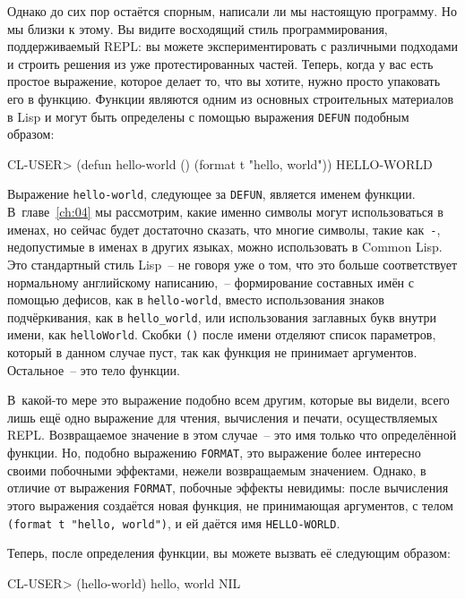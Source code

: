 Однако до сих пор остаётся спорным, написали ли мы настоящую программу. Но мы близки к этому.
Вы видите восходящий стиль программирования, поддерживаемый REPL: вы можете
экспериментировать с различными подходами и строить решения из уже протестированных
частей. Теперь, когда у вас есть простое выражение, которое делает то, что вы хотите,
нужно просто упаковать его в функцию. Функции являются одним из основных строительных
материалов в Lisp и могут быть определены с помощью выражения \lstinline{DEFUN} подобным образом:

\begin{myverb}
CL-USER> (defun hello-world () (format t "hello, world"))
HELLO-WORLD
\end{myverb}

Выражение \lstinline{hello-world}, следующее за \lstinline{DEFUN}, является именем функции. В~главе~\ref{ch:04} мы
рассмотрим, какие именно символы могут использоваться в именах, но сейчас будет достаточно
сказать, что многие символы, такие как~\lstinline|-|, недопустимые в именах в других
языках, можно использовать в Common Lisp. Это стандартный стиль Lisp~-- не говоря уже о том,
что это больше соответствует нормальному английскому написанию,~-- формирование составных имён с помощью дефисов,
как в \lstinline{hello-world}, вместо использования знаков подчёркивания, как в \lstinline|hello_world|, или
использования заглавных букв внутри имени, как \lstinline{helloWorld}. Скобки \lstinline{()} после имени отделяют
список параметров, который в данном случае пуст, так как функция не принимает
аргументов. Остальное~-- это тело функции.

В~какой-то мере это выражение подобно всем другим, которые вы видели, всего лишь ещё одно
выражение для чтения, вычисления и печати, осуществляемых REPL. Возвращаемое значение в
этом случае~-- это имя только что определённой функции. Но, подобно выражению
\lstinline{FORMAT}, это выражение более интересно своими побочными эффектами, нежели
возвращаемым значением. Однако, в отличие от выражения \lstinline{FORMAT}, побочные
эффекты невидимы: после вычисления этого выражения создаётся новая функция, не принимающая
аргументов, с телом \lstinline{(format t "hello, world")}, и ей даётся имя
\lstinline{HELLO-WORLD}.

Теперь, после определения функции, вы можете вызвать её следующим образом:

\begin{myverb}
CL-USER> (hello-world)
hello, world
NIL
\end{myverb}

